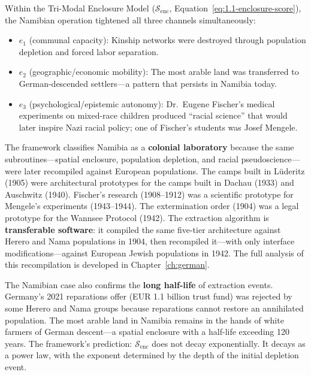Within the Tri-Modal Enclosure Model ($\mathcal{S}_{\text{enc}}$, Equation~\ref{eq:1.1-enclosure-score}), the Namibian operation tightened all three channels simultaneously:
\begin{itemize}
    \item $e_1$ (communal capacity): Kinship networks were destroyed through population depletion and forced labor separation.
    \item $e_2$ (geographic/economic mobility): The most arable land was transferred to German-descended settlers---a pattern that persists in Namibia today.
    \item $e_3$ (psychological/epistemic autonomy): Dr.~Eugene Fischer's medical experiments on mixed-race children produced ``racial science'' that would later inspire Nazi racial policy; one of Fischer's students was Josef Mengele.
\end{itemize}

The framework classifies Namibia as a \textbf{colonial laboratory} because the same subroutines---spatial enclosure, population depletion, and racial pseudoscience---were later recompiled against European populations. The camps built in L\"uderitz (1905) were architectural prototypes for the camps built in Dachau (1933) and Auschwitz (1940). Fischer's research (1908--1912) was a scientific prototype for Mengele's experiments (1943--1944). The extermination order (1904) was a legal prototype for the Wannsee Protocol (1942). The extraction algorithm is \textbf{transferable software}: it compiled the same five-tier architecture against Herero and Nama populations in 1904, then recompiled it---with only interface modifications---against European Jewish populations in 1942. The full analysis of this recompilation is developed in Chapter~\ref{ch:german}.

The Namibian case also confirms the \textbf{long half-life} of extraction events. Germany's 2021 reparations offer (EUR 1.1 billion trust fund) was rejected by some Herero and Nama groups because reparations cannot restore an annihilated population. The most arable land in Namibia remains in the hands of white farmers of German descent---a spatial enclosure with a half-life exceeding 120 years. The framework's prediction: $\mathcal{S}_{\text{enc}}$ does not decay exponentially. It decays as a power law, with the exponent determined by the depth of the initial depletion event.

